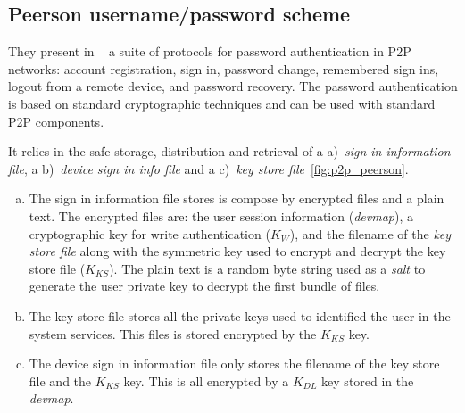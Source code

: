 \subsection{Peerson username/password scheme}

They present in ~\cite{kreitz2012passwords} a suite of protocols for password
authentication in P2P networks: account registration, sign in, password change,
remembered sign ins, logout from a remote device, and password recovery. The
password authentication is based on standard cryptographic techniques and can
be used with standard P2P components. 

It relies in the safe storage, distribution and retrieval of a a)~\textit{sign in information
file}, a b)~\textit{device sign in info file} and a c)~\textit{key store
file}~\ref{fig:p2p_peerson}.

\begin{enumerate}[a)]

  \item The sign in information file stores is compose by encrypted files and a
plain text. The encrypted files are: the user session information (\textit{devmap}), a
cryptographic key for write authentication ($K_W$), and the filename of the
\textit{key store file} along with the symmetric key used to encrypt and
decrypt the key store file ($K_{KS}$). The plain text is a random byte string used as a \textit{salt} to generate the user private key to
decrypt the first bundle of files. 

  \item The key store file stores all the private keys used to identified the
    user in the system services. This files is stored encrypted by the $K_{KS}$ key.

  \item The device sign in information file only stores the filename of the key
    store file and the $K_{KS}$ key. This is all encrypted by a $K_{DL}$ key
    stored in the \textit{devmap}.
\end{enumerate}

